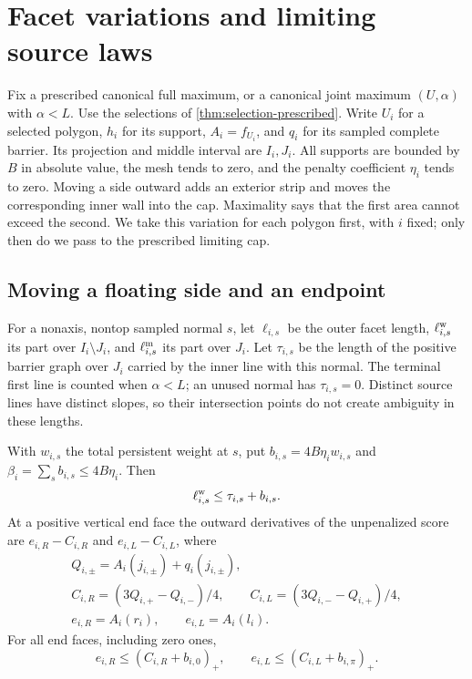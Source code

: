 \section{Facet variations and limiting source laws}\label{sec:variations}

Fix a prescribed canonical full maximum, or a canonical joint maximum
$(U,\alpha)$ with $\alpha<L$. Use the selections of
\cref{thm:selection-prescribed}. Write $U_i$ for a selected polygon,
$h_i$ for its support, $A_i=f_{U_i}$, and $q_i$ for its sampled
complete barrier. Its projection and middle interval are $I_i,J_i$.
All supports are bounded by $B$ in absolute value, the mesh tends
to zero, and the penalty coefficient $\eta_i$ tends to zero.
Moving a side outward adds an exterior strip and moves the corresponding
inner wall into the cap. Maximality says that the first area cannot
exceed the second. We take this variation for each polygon first, with
$i$ fixed; only then do we pass to the prescribed limiting cap.

\subsection{Moving a floating side and an endpoint}

For a nonaxis, nontop sampled normal $s$, let $\ell_{i,s}$ be the
outer facet length, $\ell^{\rm w}_{i,s}$ its part over
$I_i\setminus J_i$, and $\ell^{\rm m}_{i,s}$ its part over $J_i$.
Let $\tau_{i,s}$ be the length of the positive barrier graph over
$J_i$ carried by the inner line with this normal. The terminal first
line is counted when $\alpha<L$; an unused normal has $\tau_{i,s}=0$.
Distinct source lines have distinct slopes, so their intersection
points do not create ambiguity in these lengths.

\begin{lemma}\label{lem:variation-finite}
With $w_{i,s}$ the total persistent weight at $s$, put
$b_{i,s}=4B\eta_iw_{i,s}$ and $\beta_i=\sum_s b_{i,s}\le4B\eta_i$.
Then
\begin{equation}\label{eq:variation-facet}
 \ell^{\rm w}_{i,s}\le\tau_{i,s}+b_{i,s}.
\end{equation}
At a positive vertical end face the outward derivatives of the
unpenalized score are $e_{i,R}-C_{i,R}$ and $e_{i,L}-C_{i,L}$, where
\begin{equation}\label{eq:variation-pressures}
 \begin{gathered}
 Q_{i,\pm}=A_i(j_{i,\pm})+q_i(j_{i,\pm}),\\
 C_{i,R}=(3Q_{i,+}-Q_{i,-})/4,\qquad
 C_{i,L}=(3Q_{i,-}-Q_{i,+})/4,\\
 e_{i,R}=A_i(r_i),\qquad e_{i,L}=A_i(l_i).
 \end{gathered}
\end{equation}
For all end faces, including zero ones,
\begin{equation}\label{eq:variation-endpoint-upper}
 e_{i,R}\le(C_{i,R}+b_{i,0})_+,\qquad
 e_{i,L}\le(C_{i,L}+b_{i,\pi})_+.
\end{equation}
\end{lemma}

